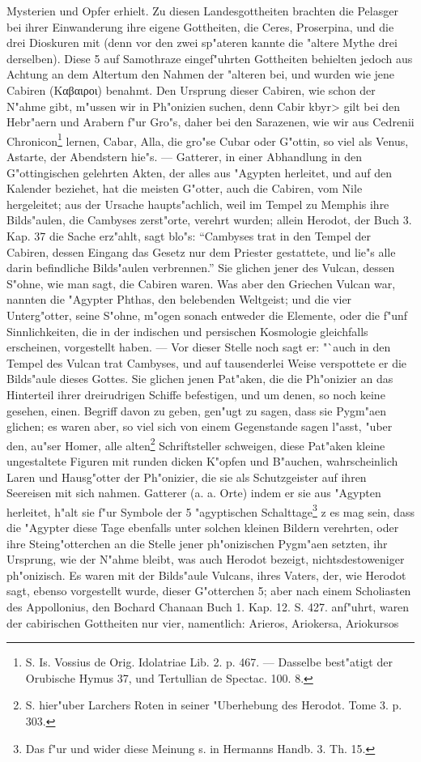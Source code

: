 \documentclass[a4paper, 11pt, oneside, polutonikogreek, german]{article}
\begin{document}
Mysterien und Opfer erhielt. Zu diesen Landesgottheiten brachten die Pelasger bei ihrer Einwanderung ihre eigene Gottheiten, die Ceres, Proserpina, und die drei Dioskuren mit (denn vor den zwei sp"ateren kannte die "altere Mythe drei derselben). Diese 5 auf Samothraze eingef"uhrten Gottheiten behielten jedoch aus Achtung an dem Altertum den Nahmen der "alteren bei, und wurden wie jene Cabiren (Καβαιροι) benahmt. Den Ursprung dieser Cabiren, wie schon der N"ahme gibt, m"ussen wir in Ph"onizien suchen, denn Cabir \<kbyr> gilt bei den Hebr"aern und Arabern f"ur Gro"s, daher bei den Sarazenen, wie wir aus Cedrenii Chronicon\footnote{S. Is. Vossius de Orig. Idolatriae Lib. 2. p. 467. --- Dasselbe best"atigt der Orubische Hymus 37, und Tertullian de Spectac. 100. 8.} lernen, Cabar, Alla, die gro"se Cubar oder G"ottin, so viel als Venus, Astarte, der Abendstern hie"s. --- Gatterer, in einer Abhandlung in den G"ottingischen gelehrten Akten, der alles aus "Agypten herleitet, und auf den Kalender beziehet, hat die meisten G"otter, auch die Cabiren, vom Nile hergeleitet; aus der Ursache haupts"achlich, weil im Tempel zu Memphis ihre Bilds"aulen, die Cambyses zerst"orte, verehrt wurden; allein Herodot, der Buch 3. Kap. 37 die Sache erz"ahlt, sagt blo"s: "`Cambyses trat in den Tempel der Cabiren, dessen Eingang das Gesetz nur dem Priester gestattete, und lie"s alle darin befindliche Bilds"aulen verbrennen."' Sie glichen jener des Vulcan, dessen S"ohne, wie man sagt, die Cabiren waren. Was aber den Griechen Vulcan war, nannten die "Agypter Phthas, den belebenden Weltgeist; und die vier Unterg"otter, seine S"ohne, m"ogen sonach entweder die Elemente, oder die f"unf Sinnlichkeiten, die in der indischen und persischen Kosmologie gleichfalls erscheinen, vorgestellt haben. --- Vor dieser Stelle noch sagt er: "`auch in den Tempel des Vulcan trat Cambyses, und auf tausenderlei Weise verspottete er die Bilds"aule dieses Gottes. Sie glichen jenen Pat"aken, die die Ph"onizier an das Hinterteil ihrer dreirudrigen Schiffe befestigen, und um denen, so noch keine gesehen, einen. Begriff davon zu geben, gen"ugt zu sagen, dass sie Pygm"aen glichen; es waren aber, so viel sich von einem Gegenstande sagen l"asst, "uber den, au"ser Homer, alle alten\footnote{S. hier"uber Larchers Roten in seiner "Uberhebung des Herodot. Tome 3. p. 303.} Schriftsteller schweigen, diese Pat"aken kleine ungestaltete Figuren mit runden dicken K"opfen und B"auchen, wahrscheinlich Laren und Hausg"otter der Ph"onizier, die sie als Schutzgeister auf ihren Seereisen mit sich nahmen. Gatterer (a. a. Orte) indem er sie aus "Agypten herleitet, h"alt sie f"ur Symbole der 5 "agyptischen Schalttage\footnote{Das f"ur und wider diese Meinung s. in Hermanns Handb. 3. Th. 15.} z es mag sein, dass die "Agypter diese Tage ebenfalls unter solchen kleinen Bildern verehrten, oder ihre Steing"otterchen an die Stelle jener ph"onizischen Pygm"aen setzten, ihr Ursprung, wie der N"ahme bleibt, was auch Herodot bezeigt, nichtsdestoweniger ph"onizisch. Es waren mit der Bilds"aule Vulcans, ihres Vaters, der, wie Herodot sagt, ebenso vorgestellt wurde, dieser G"otterchen 5; aber nach einem Scholiasten des Appollonius, den Bochard Chanaan Buch 1. Kap. 12. S. 427. anf"uhrt, waren der cabirischen Gottheiten nur vier, namentlich: Arieros, Ariokersa, Ariokursos 
\end{document}
